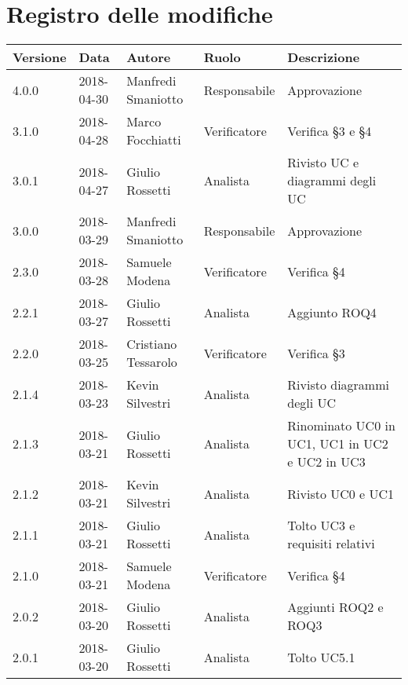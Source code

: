 \documentclass[./AnalisideiRequisiti.tex]{subfiles}
\begin{document}
	
{
	\chapter*{Registro delle modifiche}
\setlength\LTleft{-22mm}
	\begin{longtable}{|p{20mm}|p{20mm}|p{40mm}|p{30mm}|p{50mm}|}
		\hline
		\textbf{Versione} & \textbf{Data} & \textbf{Autore} & \textbf{Ruolo} & \textbf{Descrizione} \\ \hline 
		    
		4.0.0 & 2018-04-30 & Manfredi Smaniotto & Responsabile & Approvazione\\ \hline
		3.1.0 & 2018-04-28 & Marco Focchiatti & Verificatore & Verifica §3 e §4\\ \hline 
		3.0.1 & 2018-04-27 & Giulio Rossetti & Analista & Rivisto UC e diagrammi degli UC\\ \hline
		    
		3.0.0 & 2018-03-29 & Manfredi Smaniotto & Responsabile & Approvazione\\ \hline 
		2.3.0 & 2018-03-28 & Samuele Modena & Verificatore & Verifica §4\\ \hline 		
		2.2.1 & 2018-03-27 & Giulio Rossetti & Analista & Aggiunto ROQ4\\ \hline 
		2.2.0 & 2018-03-25 & Cristiano Tessarolo & Verificatore & Verifica §3\\ \hline 
		2.1.4 & 2018-03-23 & Kevin Silvestri & Analista & Rivisto diagrammi degli UC\\ \hline
		2.1.3 & 2018-03-21 & Giulio Rossetti & Analista & Rinominato UC0 in UC1, UC1 in UC2 e UC2 in UC3\\ \hline
		2.1.2 & 2018-03-21 & Kevin Silvestri & Analista & Rivisto UC0 e UC1\\ \hline
		2.1.1 & 2018-03-21 & Giulio Rossetti & Analista & Tolto UC3 e requisiti relativi\\ \hline
		2.1.0 & 2018-03-21 & Samuele Modena & Verificatore & Verifica §4\\ \hline
		2.0.2 & 2018-03-20 & Giulio Rossetti & Analista & Aggiunti ROQ2 e ROQ3\\ \hline
		2.0.1 & 2018-03-20 & Giulio Rossetti & Analista & Tolto UC5.1\\ \hline
		

\end{longtable}}
\end{document}
